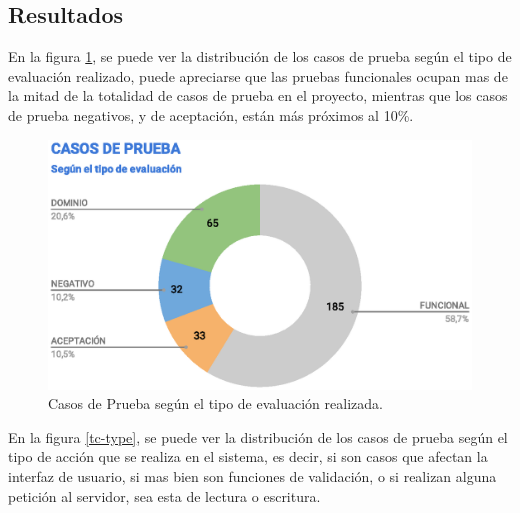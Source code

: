\begin{description}
%
\end{description}

\subsection{Resultados}
En la figura \ref{tc-tests}, se puede ver la distribución de los casos de prueba
según el tipo de evaluación realizado, puede apreciarse que las pruebas
funcionales ocupan mas de la mitad de la totalidad de casos de prueba en el
proyecto, mientras que los casos de prueba negativos, y de aceptación, están más
próximos al 10\%.

\begin{figure}
\centering
\includegraphics[width=1.0\textwidth]{graphics/tc-tests.eps}
\caption{Casos de Prueba según el tipo de evaluación realizada.}
\label{tc-tests}
\end{figure}

En la figura \ref{tc-type}, se puede ver la distribución de los casos de prueba
según el tipo de acción que se realiza en el sistema, es decir, si son casos
que afectan la interfaz de usuario, si mas bien son funciones de validación, o
si realizan alguna petición al servidor, sea esta de lectura o escritura.

